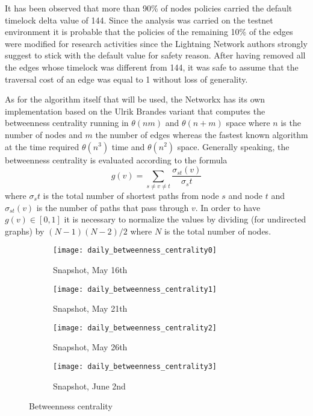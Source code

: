 	It has been observed that more than 90\% of nodes policies carried the default timelock delta value of 144. Since the analysis was carried on the testnet environment it is probable that the policies of the remaining 10\% of the edges were modified for research activities since the Lightning Network authors strongly suggest to stick with the default value for safety reason. After having removed all the edges whose timelock was different from 144, it was safe to assume that the traversal cost of an edge was equal to 1 without loss of generality.
	
	As for the algorithm itself that will be used, the Networkx has its own implementation based on the Ulrik Brandes \cite{Brandes2001} variant that computes the betweenness centrality running in $\theta(nm)$ and $\theta(n + m)$ space where $n$ is the number of nodes and $m$ the number of edges whereas the fastest known algorithm at the time required $\theta(n^3)$ time and $\theta(n^2)$ space.	Generally speaking, the betweenness centrality is evaluated according to the formula 
	\begin{equation}
		g(v) = \sum_{s \neq v \neq t}{\frac{\sigma_{st}(v) }{\sigma_st}}
	\end{equation}
	where $\sigma_st$ is the total number of shortest paths from node $s$ and node $t$ and $\sigma_{st}(v)$ is the number of paths that pass through $v$. In order to have $g(v) \in [0, 1]$ it is necessary to normalize the values by dividing (for undirected graphs) by $(N-1)(N-2)/2$ where $N$ is the total number of nodes.

	\begin{figure}
		\centering
		\begin{subfigure}{0.45\textwidth}
			\centering
			\texttt{[image: daily\_betweenness\_centrality0]}
			\caption{Snapshot, May 16th}
			\label{daily_beetwenness0}
		\end{subfigure}
		\begin{subfigure}{0.45\textwidth}
			\centering
			\texttt{[image: daily\_betweenness\_centrality1]}
			\caption{Snapshot, May 21th}
			\label{daily_betweenness1}
		\end{subfigure}
		\begin{subfigure}{0.45\textwidth}
			\centering
			\texttt{[image: daily\_betweenness\_centrality2]}
			\caption{Snapshot, May 26th}
			\label{daily_betweenness2}
		\end{subfigure}
		\begin{subfigure}{0.45\textwidth}
			\centering
			\texttt{[image: daily\_betweenness\_centrality3]}
			\caption{Snapshot, June 2nd}
			\label{daily_betweenness3}
		\end{subfigure}
		
		\caption{Betweenness centrality}
		\label{daily_betweenness}
	\end{figure}	
	
